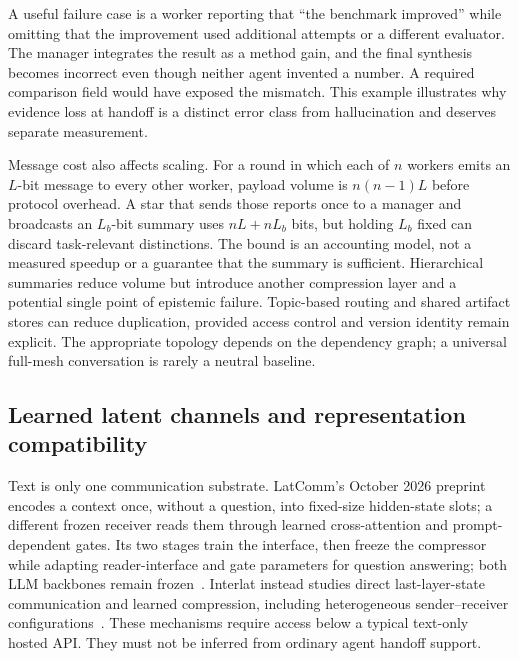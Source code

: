 A useful failure case is a worker reporting that ``the benchmark improved'' while omitting that the improvement used additional attempts or a different evaluator. The manager integrates the result as a method gain, and the final synthesis becomes incorrect even though neither agent invented a number. A required comparison field would have exposed the mismatch. This example illustrates why evidence loss at handoff is a distinct error class from hallucination and deserves separate measurement.

Message cost also affects scaling. For a round in which each of $n$ workers emits an $L$-bit message to every other worker, payload volume is $n(n-1)L$ before protocol overhead. A star that sends those reports once to a manager and broadcasts an $L_b$-bit summary uses $nL+nL_b$ bits, but holding $L_b$ fixed can discard task-relevant distinctions. The bound is an accounting model, not a measured speedup or a guarantee that the summary is sufficient. Hierarchical summaries reduce volume but introduce another compression layer and a potential single point of epistemic failure. Topic-based routing and shared artifact stores can reduce duplication, provided access control and version identity remain explicit. The appropriate topology depends on the dependency graph; a universal full-mesh conversation is rarely a neutral baseline.

\subsection{Learned latent channels and representation compatibility}\label{sec:C21:latent}
Text is only one communication substrate. LatComm's October 2026 preprint encodes a context once, without a question, into fixed-size hidden-state slots; a different frozen receiver reads them through learned cross-attention and prompt-dependent gates. Its two stages train the interface, then freeze the compressor while adapting reader-interface and gate parameters for question answering; both LLM backbones remain frozen~\cite{lin2026latcomm}. Interlat instead studies direct last-layer-state communication and learned compression, including heterogeneous sender--receiver configurations~\cite{du2026interlat}. These mechanisms require access below a typical text-only hosted API. They must not be inferred from ordinary agent handoff support.

